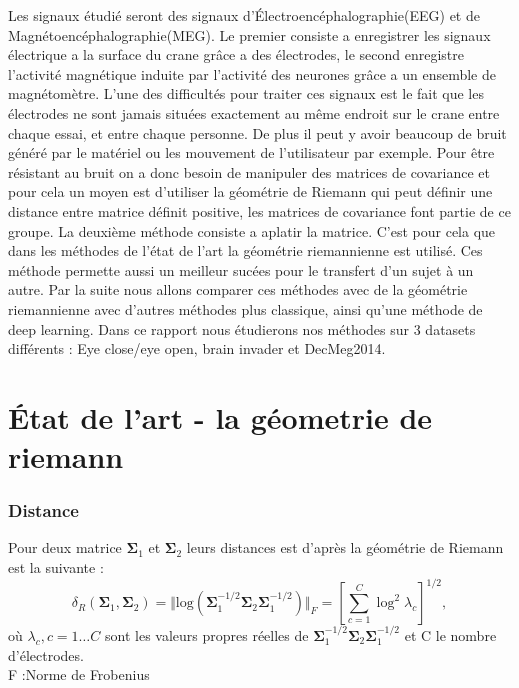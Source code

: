 \documentclass{article}
\begin{document}
Les signaux étudié seront des signaux d'Électroencéphalographie(EEG) et de Magnétoencéphalographie(MEG). Le premier consiste a enregistrer les signaux électrique a la surface du crane grâce a des électrodes, le second enregistre l'activité magnétique induite par l'activité des neurones grâce a un ensemble de magnétomètre.
\newline
\newline
L'une des difficultés pour traiter ces signaux est le fait que les électrodes ne sont jamais situées exactement au même endroit sur le crane entre chaque essai, et entre chaque personne. De plus il peut y avoir beaucoup de bruit généré par le matériel ou les mouvement de l'utilisateur par exemple.
\newline
\newline
Pour être résistant au bruit on a donc besoin de manipuler des matrices de covariance et pour cela un moyen est d'utiliser la géométrie de Riemann qui peut définir une distance entre matrice définit positive, les matrices de covariance font partie de ce groupe. La deuxième méthode consiste a aplatir la matrice.
\newline
\newline
C'est pour cela que dans les méthodes de l’état de l'art la géométrie riemannienne est utilisé. Ces méthode permette aussi un meilleur sucées pour le transfert d'un sujet à un autre.
\newline
\newline
Par la suite nous allons comparer ces méthodes avec de la géométrie riemannienne avec d'autres méthodes plus classique, ainsi qu'une méthode de deep learning.
\newline
\newline
Dans ce rapport nous étudierons nos méthodes sur 3 datasets différents : Eye close/eye open, brain invader et DecMeg2014.\\



\part{État de l'art - la géometrie de riemann}
\section{Distance}
Pour deux matrice $\mathbf{\Sigma}_1$ et $\mathbf{\Sigma}_2$ leurs distances est d’après la géométrie de Riemann est la suivante :\\
\begin{equation}
\label{eq:Rgeodistance}
\delta_R(\mathbf{\Sigma}_1,\mathbf{\Sigma}_2) 
= 
\Vert \mathrm{log} \left( \mathbf{\Sigma}_1^{-1/2} \mathbf{\Sigma}_2 \mathbf{\Sigma}_1^{-1/2} \right) \Vert_F
=
\left[ \sum_{c=1}^{C} \log^2 \lambda_c \right]^{1/2},
\end{equation}
où $\lambda_c, c=1\ldots C$ sont les valeurs propres réelles de $\mathbf{\Sigma}_1^{-1/2} \mathbf{\Sigma}_2 \mathbf{\Sigma}_1^{-1/2}$ et C le nombre d’électrodes.
\\
F :Norme de Frobenius
\end{document}
